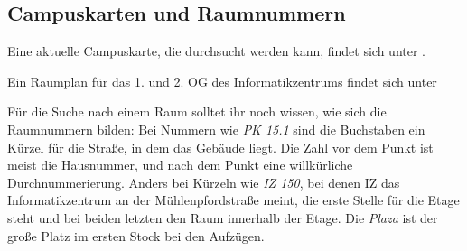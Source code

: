 \subsection{Campuskarten und Raumnummern}
\label{campuskarte}
Eine aktuelle Campuskarte, die durchsucht werden kann, findet sich unter .

Ein Raumplan für das 1. und 2. OG des Informatikzentrums findet sich
unter 


Für die Suche nach einem Raum solltet ihr noch wissen, wie sich die Raumnummern bilden: Bei Nummern wie \textit{PK 15.1} sind die Buchstaben ein Kürzel für die Straße, in dem das Gebäude liegt. Die Zahl vor dem Punkt ist meist die Hausnummer, und nach dem Punkt eine willkürliche Durchnummerierung. Anders bei Kürzeln wie \textit{IZ 150}, bei denen IZ das Informatikzentrum an der Mühlenpfordstraße meint, die erste Stelle für die Etage steht und bei beiden letzten den Raum innerhalb der Etage. Die \textit{Plaza} ist der große Platz im ersten Stock bei den Aufzügen.
